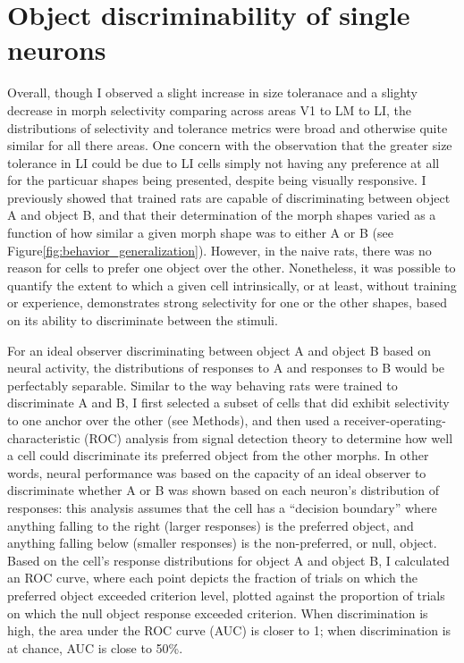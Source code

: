 \section{Object discriminability of single neurons}
% 
Overall, though I observed a slight increase in size toleranace and a slighty decrease in morph selectivity comparing across areas V1 to LM to LI, the distributions of selectivity and tolerance metrics were broad and otherwise quite similar for all there areas. One concern with the observation that the greater size tolerance in LI could be due to LI cells simply not having any preference at all for the particuar shapes being presented, despite being visually responsive.  
I previously showed that trained rats are capable of discriminating between object A and object B, and that their determination of the morph shapes varied as a function of how similar a given morph shape was to either A or B (see Figure\ref{fig:behavior_generalization}). However, in the naive rats, there was no reason for cells to prefer one object over the other. Nonetheless, it was possible to quantify the extent to which a given cell intrinsically, or at least, without training or experience, demonstrates strong selectivity for one or the other shapes, based on its ability to discriminate between the stimuli.

For an ideal observer discriminating between object A and object B based on neural activity, the distributions of responses to A and responses to B would be perfectably separable. Similar to the way behaving rats were trained to discriminate A and B, I first selected a subset of cells that did exhibit selectivity to one anchor over the other (see Methods), and then used a receiver-operating-characteristic (ROC) analysis from signal detection theory to determine how well a cell could discriminate its preferred object from the other morphs\cite{Green1966, Britten1992, Busse2011}. In other words, neural performance was based on the capacity of an ideal observer to discriminate whether A or B was shown based on each neuron's distribution of responses:  this analysis assumes that the cell has a ``decision boundary'' where anything falling to the right (larger responses) is the preferred object, and anything falling below (smaller responses) is the non-preferred, or null, object. Based on the cell's response distributions for object A and object B, I calculated an ROC curve, where each point depicts the fraction of trials on which the preferred object exceeded criterion level, plotted against the proportion of trials on which the null object response exceeded criterion. When discrimination is high, the area under the ROC curve (AUC) is closer to 1; when discrimination is at chance, AUC is close to 50\%. 

